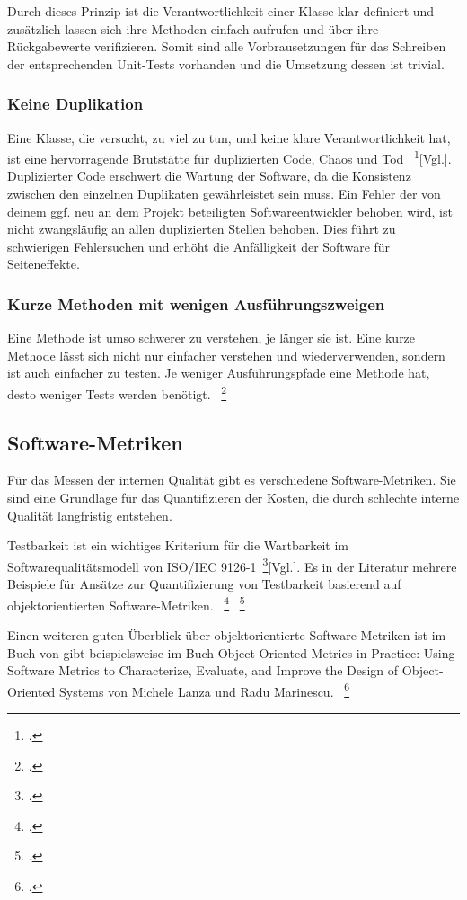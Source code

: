 Durch dieses Prinzip ist die Verantwortlichkeit einer Klasse klar definiert und zusätzlich lassen sich ihre Methoden einfach
aufrufen und über ihre Rückgabewerte verifizieren. Somit sind alle Vorbrausetzungen für das Schreiben der entsprechenden 
Unit-Tests vorhanden und die Umsetzung dessen ist trivial.

\subsubsection{Keine Duplikation}
Eine Klasse, die versucht, zu viel zu tun, und keine klare Verantwortlichkeit hat, ist eine
hervorragende Brutstätte für duplizierten Code, Chaos und Tod ~\footcite{Fowler.2000}[Vgl.]. Duplizierter
Code erschwert die Wartung der Software, da die Konsistenz zwischen den einzelnen Duplikaten gewährleistet 
sein muss. Ein Fehler der von deinem ggf. neu an dem Projekt beteiligten Softwareentwickler behoben wird, 
ist nicht zwangsläufig an allen duplizierten Stellen behoben. Dies führt zu schwierigen Fehlersuchen und 
erhöht die Anfälligkeit der Software für Seiteneffekte. 

\subsubsection{Kurze Methoden mit wenigen Ausführungszweigen}
Eine Methode ist umso schwerer zu verstehen, je länger sie ist. Eine kurze Methode lässt
sich nicht nur einfacher verstehen und wiederverwenden, sondern ist auch einfacher zu
testen. Je weniger Ausführungspfade eine Methode hat, desto weniger Tests werden benötigt. ~\footcite[Vgl. Seite 9]{Bergmann.2013}

\subsection{Software-Metriken}\label{software-metriken}
Für das Messen der internen Qualität gibt es verschiedene Software-Metriken. Sie sind eine Grundlage für das Quantifizieren der Kosten, die durch schlechte interne Qualität langfristig entstehen.

Testbarkeit ist ein wichtiges Kriterium für die Wartbarkeit im Softwarequalitätsmodell von ISO/IEC 9126-1~\footcite{ISOIEC91261}[Vgl.]. Es in der Literatur mehrere Beispiele für Ansätze zur Quantifizierung von Testbarkeit basierend auf objektorientierten Software-Metriken. ~\footcite[Vgl. Seite 136-145]{Bruntink.2004} ~\footcite[Vgl. Seite 1 - 6]{Khan.2009}

Einen weiteren guten Überblick über objektorientierte Software-Metriken ist im Buch von gibt beispielsweise im Buch \dq{}Object-Oriented Metrics in Practice: Using Software Metrics to Characterize, Evaluate, and Improve the Design of Object-Oriented Systems\dq{} von Michele Lanza und Radu Marinescu. ~\footcite[Vgl.]{Lanza.2006}

